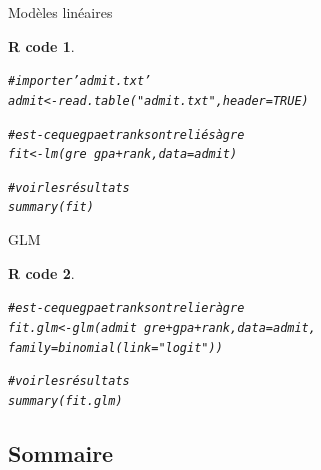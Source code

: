 \documentclass[11pt]{beamer}\usepackage[]{graphicx}\usepackage[]{color}
\makeatletter
\newcommand{\hlnum}[1]{\textcolor[rgb]{0.063,0.58,0.627}{#1}}%
\newcommand{\hlstr}[1]{\textcolor[rgb]{0.063,0.58,0.627}{#1}}%
\newcommand{\hlcom}[1]{\textcolor[rgb]{0.588,0.588,0.588}{#1}}%
\newcommand{\hlopt}[1]{\textcolor[rgb]{0.196,0.196,0.196}{#1}}%
\newcommand{\hlstd}[1]{\textcolor[rgb]{0.196,0.196,0.196}{#1}}%
\newcommand{\hlkwb}[1]{\textcolor[rgb]{0.627,0,0.314}{#1}}%
\newcommand{\hlkwc}[1]{\textcolor[rgb]{0,0.631,0.314}{#1}}%
\newcommand{\hlkwd}[1]{\textcolor[rgb]{0.78,0.227,0.412}{#1}}%
\newenvironment{kframe}{%
 \def\at@end@of@kframe{}%
 \ifinner\ifhmode%
  \def\at@end@of@kframe{\end{minipage}}%
  \begin{minipage}{\columnwidth}%
 \fi\fi%
 \def\FrameCommand##1{\hskip\@totalleftmargin \hskip-\fboxsep
 \colorbox{shadecolor}{##1}\hskip-\fboxsep
     \hskip-\linewidth \hskip-\@totalleftmargin \hskip\columnwidth}%
 \MakeFramed {\advance\hsize-\width
   \@totalleftmargin\z@ \linewidth\hsize
   \@setminipage}}%
 {\par\unskip\endMakeFramed%
 \at@end@of@kframe}
\newenvironment{knitrout}{}{} %
\newtheorem{rcode}{R code}[section]
\makeatother
\begin{document}
\begin{frame}[fragile]{Modèles linéaires}

\begin{knitrout}
\color{fgcolor}\begin{kframe}
\begin{rcode}\label{unnamed-chunk-41}\begin{alltt}
\hlcom{# importer 'admit.txt'}
\hlstd{admit} \hlkwb{<-} \hlkwd{read.table}\hlstd{(}\hlstr{"admit.txt"}\hlstd{,} \hlkwc{header} \hlstd{=} \hlnum{TRUE}\hlstd{)}

\hlcom{# est-ce que gpa et rank sont reliés à gre}
\hlstd{fit} \hlkwb{<-} \hlkwd{lm}\hlstd{(gre} \hlopt{~} \hlstd{gpa}\hlopt{+}\hlstd{rank,} \hlkwc{data} \hlstd{= admit)}

\hlcom{# voir les résultats}
\hlkwd{summary}\hlstd{(fit)}
\end{alltt}
\end{rcode}\end{kframe}
\end{knitrout}

\end{frame}


\begin{frame}[fragile]{GLM}

\begin{knitrout}
\color{fgcolor}\begin{kframe}
\begin{rcode}\label{unnamed-chunk-42}\begin{alltt}
\hlcom{# est-ce que gpa et rank sont relier à gre}
\hlstd{fit.glm} \hlkwb{<-} \hlkwd{glm}\hlstd{(admit} \hlopt{~} \hlstd{gre}\hlopt{+}\hlstd{gpa}\hlopt{+}\hlstd{rank,} \hlkwc{data} \hlstd{= admit,}
           \hlkwc{family} \hlstd{=} \hlkwd{binomial}\hlstd{(}\hlkwc{link} \hlstd{=} \hlstr{"logit"}\hlstd{))}

\hlcom{# voir les résultats}
\hlkwd{summary}\hlstd{(fit.glm)}
\end{alltt}
\end{rcode}\end{kframe}
\end{knitrout}

\end{frame}




\subsection{Sommaire}
\end{document}
